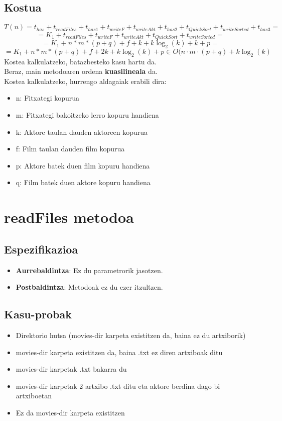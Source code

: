 \documentclass[a4paper,10pt]{report}
\begin{document}
	\subsection*{Kostua}
		\[
			T(n) = t_{has} + t_{readFiles} + t_{has1} + t_{writeF} + t_{writeAkt} + t_{has2} + t_{QuickSort} + t_{writeSorted} + t_{has3} =
		\]	
		\[
			= K_{1} + t_{readFiles} + t_{writeF} + t_{writeAkt} + t_{QuickSort} + t_{writeSorted} =
		\]
		\[	
			= K_{1} + n*m*(p+q) + f + k + k\log_{2}(k) +k + p =
		\]
		\[	
			= K_{1} + n*m*(p+q) + f + 2k + k\log_{2}(k) + p \in O(n·m·(p + q) + k\log_{2}(k)
		\]
		Kostea kalkulatzeko, batazbesteko kasu hartu da.\\
		Beraz, main metodoaren ordena \textbf{kuasilineala} da.\\
		Kostea kalkulatzeko, hurrengo aldagaiak erabili dira:
		\begin{itemize}
			\item n: Fitxategi kopurua
			\item m: Fitxategi bakoitzeko lerro kopuru handiena
			\item k: Aktore taulan dauden aktoreen kopurua
			\item f: Film taulan dauden film kopurua
			\item p: Aktore batek duen film kopuru handiena
			\item q: Film batek duen aktore kopuru handiena
		\end{itemize}

\section{readFiles metodoa}
	\subsection*{Espezifikazioa}
		\begin{itemize}
			\item \textbf{Aurrebaldintza}: Ez du parametrorik jasotzen.
			\item \textbf{Postbaldintza}: Metodoak ez du ezer itzultzen.
		\end{itemize}
	\subsection*{Kasu-probak}
	\begin{itemize}
		\item Direktorio hutsa (movies-dir karpeta existitzen da, baina ez du artxiborik)
		\item movies-dir karpeta existitzen da, baina .txt ez diren artxiboak ditu
		\item movies-dir karpetak .txt bakarra du
		\item movies-dir karpetak 2 artxibo .txt ditu eta aktore berdina dago bi artxiboetan
		\item Ez da movies-dir karpeta existitzen
	\end{itemize}
\end{document}
